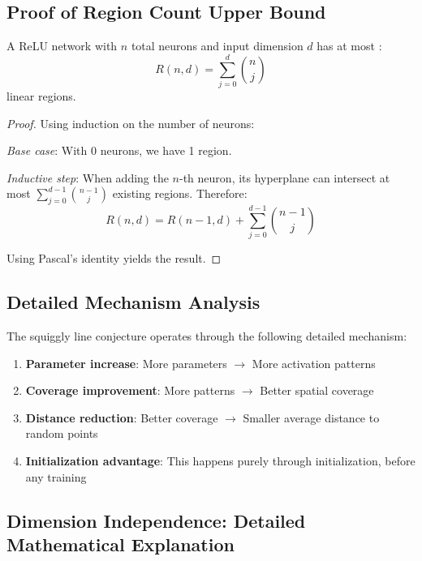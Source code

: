 \subsection{Proof of Region Count Upper Bound}
\label{subsec:region-count-proof}

\begin{theorem}
A ReLU network with $n$ total neurons and input dimension $d$ has at most \cite{Montfar2014OnTN}:
$$R(n,d) = \sum_{j=0}^d \binom{n}{j}$$
linear regions.
\end{theorem}

\begin{proof}
Using induction on the number of neurons:

\textit{Base case}: With 0 neurons, we have 1 region.

\textit{Inductive step}: When adding the $n$-th neuron, its hyperplane can intersect at most $\sum_{j=0}^{d-1} \binom{n-1}{j}$ existing regions. Therefore:
$$R(n,d) = R(n-1,d) + \sum_{j=0}^{d-1} \binom{n-1}{j}$$

Using Pascal's identity yields the result.
\end{proof}

\subsection{Detailed Mechanism Analysis}
\label{subsec:mechanism-analysis}

The squiggly line conjecture operates through the following detailed mechanism:

\begin{enumerate}
    \item \textbf{Parameter increase}: More parameters $\rightarrow$ More activation patterns
    \item \textbf{Coverage improvement}: More patterns $\rightarrow$ Better spatial coverage  
    \item \textbf{Distance reduction}: Better coverage $\rightarrow$ Smaller average distance to random points
    \item \textbf{Initialization advantage}: This happens purely through initialization, before any training
\end{enumerate}

\subsection{Dimension Independence: Detailed Mathematical Explanation}
\label{subsec:dimension-independence-detailed}

